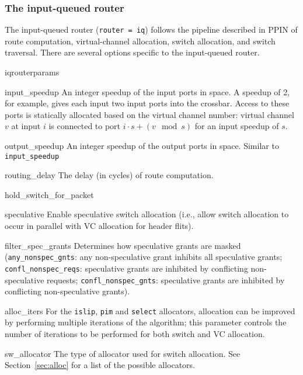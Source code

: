 \documentclass[11pt]{article}
\begin{document}
\subsubsection{The input-queued router}
\label{sec:iq_router}

The input-queued router (\texttt{router = iq}) follows the pipeline
described in PPIN of route computation, virtual-channel allocation,
switch allocation, and switch traversal.  There are several options
specific to the input-queued router.

\begin{opt_list}{iqrouterparams}

\item[input\_speedup] An integer speedup of the input ports in space.
A speedup of 2, for example, gives each input two input ports into the
crossbar.  Access to these ports is statically allocated based on the
virtual channel number: virtual channel $v$ at input $i$ is connected
to port $i \cdot s + (v \mod s)$ for an input speedup of $s$.

\item[output\_speedup] An integer speedup of the output ports in
space.  Similar to \texttt{input\_speedup}

\item[routing\_delay] The delay (in cycles) of route computation.

\item[hold\_switch\_for\_packet]

\item[speculative] Enable speculative switch allocation (i.e., allow switch allocation to occur in parallel with VC allocation for header flits).

\item[filter\_spec\_grants] Determines how speculative grants are masked (\texttt{any\_nonspec\_gnts}: any non-speculative grant inhibits all speculative grants; \texttt{confl\_nonspec\_reqs}: speculative grants are inhibited by conflicting non-speculative requests; \texttt{confl\_nonspec\_gnts}: speculative grants are inhibited by conflicting non-speculative grants).

\item[alloc\_iters] For the \texttt{islip}, \texttt{pim} and \texttt{select} allocators, allocation can be improved by performing multiple iterations of the algorithm; this parameter controls the number of iterations to be performed for both switch and VC allocation.

\item[sw\_allocator] The type of allocator used for switch allocation.
See Section~\ref{sec:alloc} for a list of the possible allocators.


\end{opt_list}
\end{document}
